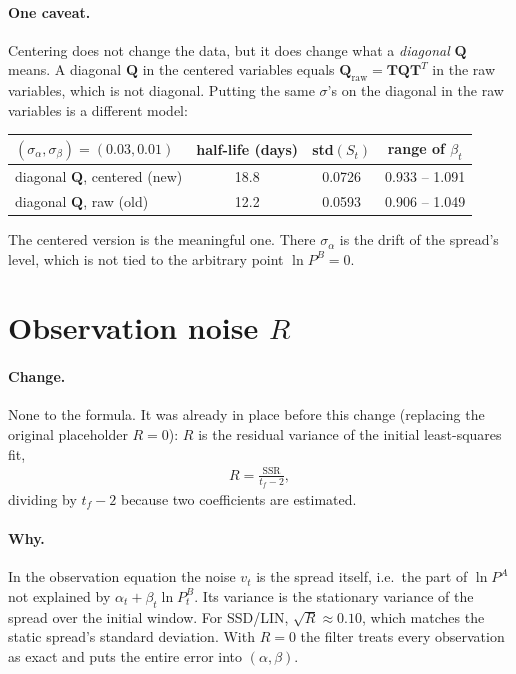 \documentclass[11pt]{article}
\newcommand{\bs}[1]{\boldsymbol{#1}}
\begin{document}
\paragraph{One caveat.} Centering does not change the data, but it does change
what a \emph{diagonal} $\bs{Q}$ means. A diagonal $\bs{Q}$ in the centered
variables equals $\bs{Q}_{\text{raw}} = \bs{T}\bs{Q}\bs{T}^T$ in the raw
variables, which is not diagonal. Putting the same $\sigma$'s on the diagonal
in the raw variables is a different model:

\begin{center}
\begin{tabular}{lccc}
    \toprule
    $(\sigma_\alpha, \sigma_\beta) = (0.03, 0.01)$ & half-life (days) & std$(S_t)$ & range of $\beta_t$ \\
    \midrule
    diagonal $\bs{Q}$, centered (new) & 18.8 & 0.0726 & 0.933 -- 1.091 \\
    diagonal $\bs{Q}$, raw (old)      & 12.2 & 0.0593 & 0.906 -- 1.049 \\
    \bottomrule
\end{tabular}
\end{center}
The centered version is the meaningful one. There $\sigma_\alpha$ is the drift
of the spread's level, which is not tied to the arbitrary point
$\ln P^B = 0$.

\section{Observation noise $R$}

\paragraph{Change.} None to the formula. It was already in place before this
change (replacing the original placeholder $R = 0$): $R$ is the residual
variance of the initial least-squares fit,
\begin{gather*}
    R = \frac{\text{SSR}}{t_f - 2},
\end{gather*}
dividing by $t_f - 2$ because two coefficients are estimated.

\paragraph{Why.} In the observation equation the noise $v_t$ is the spread
itself, i.e.\ the part of $\ln P^A$ not explained by $\alpha_t + \beta_t\ln
P^B_t$. Its variance is the stationary variance of the spread over the initial
window. For SSD/LIN, $\sqrt{R} \approx 0.10$, which matches the static spread's
standard deviation. With $R = 0$ the filter treats every observation as exact
and puts the entire error into $(\alpha, \beta)$.
\end{document}
